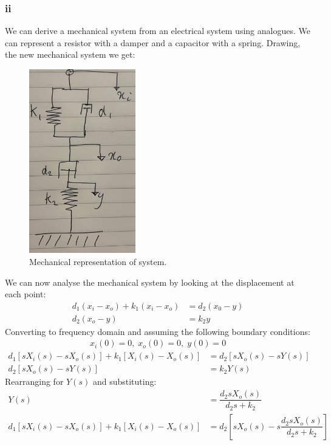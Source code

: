 \documentclass[11pt]{article}
\numberwithin{equation}{section}
\begin{document}
\subsubsection{ii}
We can derive a mechanical system from an electrical system using analogues. We can represent a resistor with a damper and a capacitor with a spring. Drawing, the new mechanical system we get:
\begin{figure}[H]
    \centering
    \includegraphics[height = 8cm]{./img/q1dii1.jpg}
    \caption{Mechanical representation of system.}
    \label{fig:q1dii1}
\end{figure}
We can now analyse the mechanical system by looking at the displacement at each point:
\begin{align}
    d_1 (x_i - x_o) + k_1 (x_i - x_o) &= d_2 (x_0 - y)\\
    d_2 (x_o - y) &= k_2 y
\end{align}
Converting to frequency domain and assuming the following boundary conditions:
\begin{gather}
    x_i(0) = 0, \; x_o(0) = 0, \; y(0) = 0
\end{gather}
\begin{align}
    d_1 \left[sX_i(s) - sX_o(s)\right] + k_1 \left[X_i(s) - X_o(s)\right] &= d_2 \left[sX_o(s) - sY(s)\right]\\
    d_2\left[sX_o(s)-sY(s)\right] &= k_2Y(s)
\end{align}
Rearranging for $Y(s)$ and substituting:
\begin{align}
    Y(s) &= \dfrac{d_2sX_o(s)}{d_2s +k_2}\\
    d_1 \left[sX_i(s) - sX_o(s)\right] + k_1 \left[X_i(s) - X_o(s)\right] &= d_2 \left[sX_o(s) - s\dfrac{d_2sX_o(s)}{d_2s +k_2}\right]
\end{align}
\end{document}
